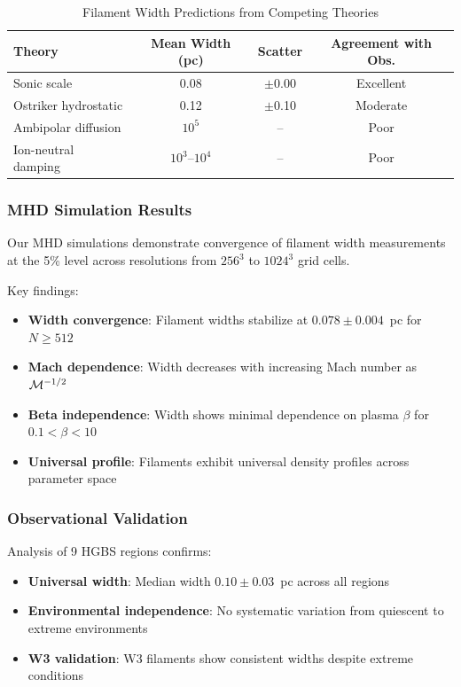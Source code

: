 \documentclass[11pt,a4paper]{article}
\begin{document}
\begin{table}[H]
\centering
\caption{Filament Width Predictions from Competing Theories}
\begin{tabular}{lccc}
\toprule
Theory & Mean Width (pc) & Scatter & Agreement with Obs. \\
\midrule
Sonic scale & 0.08 & $\pm$0.00 & Excellent \\
Ostriker hydrostatic & 0.12 & $\pm$0.10 & Moderate \\
Ambipolar diffusion & $10^5$ & -- & Poor \\
Ion-neutral damping & $10^3$--$10^4$ & -- & Poor \\
\bottomrule
\end{tabular}
\end{table}

\subsubsection{MHD Simulation Results}

Our MHD simulations demonstrate convergence of filament width measurements at the 5\% level across resolutions from $256^3$ to $1024^3$ grid cells.

Key findings:
\begin{itemize}
    \item \textbf{Width convergence}: Filament widths stabilize at $0.078 \pm 0.004$~pc for $N \ge 512$
    \item \textbf{Mach dependence}: Width decreases with increasing Mach number as ${\cal M}^{-1/2}$
    \item \textbf{Beta independence}: Width shows minimal dependence on plasma $\beta$ for $0.1 < \beta < 10$
    \item \textbf{Universal profile}: Filaments exhibit universal density profiles across parameter space
\end{itemize}

\subsubsection{Observational Validation}

Analysis of 9 HGBS regions confirms:
\begin{itemize}
    \item \textbf{Universal width}: Median width $0.10 \pm 0.03$~pc across all regions
    \item \textbf{Environmental independence}: No systematic variation from quiescent to extreme environments
    \item \textbf{W3 validation}: W3 filaments show consistent widths despite extreme conditions
\end{itemize}
\end{document}
